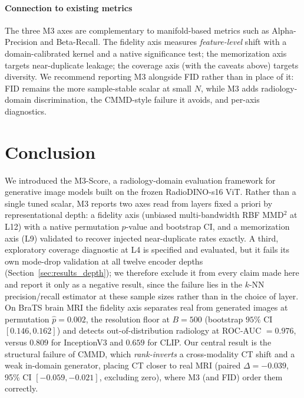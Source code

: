 \documentclass[lettersize,journal]{IEEEtran}
\begin{document}
\paragraph{Connection to existing metrics}
The three M3 axes are complementary to manifold-based metrics such as
Alpha-Precision and Beta-Recall. The fidelity axis measures
\emph{feature-level} shift with a domain-calibrated kernel and a native
significance test; the memorization axis targets near-duplicate leakage; the
coverage axis (with the caveats above) targets diversity. We recommend
reporting M3 alongside FID rather than in place of it: FID remains the more
sample-stable scalar at small $N$, while M3 adds radiology-domain
discrimination, the CMMD-style failure it avoids, and per-axis diagnostics.

\section{Conclusion}
\label{sec:conclusion}

We introduced the M3-Score, a radiology-domain evaluation framework for
generative image models built on the frozen RadioDINO-s16 ViT. Rather than a
single tuned scalar, M3 reports two axes read from layers fixed a priori by
representational depth: a fidelity axis (unbiased multi-bandwidth RBF
MMD$^2$ at L12) with a native permutation $p$-value and bootstrap CI, and a
memorization axis (L9) validated to recover injected near-duplicate rates
exactly. A third, exploratory coverage diagnostic at L4 is specified and
evaluated, but it fails its own mode-drop validation at all twelve encoder
depths (Section~\ref{sec:results_depth}); we therefore exclude it from every
claim made here and report it only as a negative result, since the failure
lies in the $k$-NN precision/recall estimator at these sample sizes rather
than in the choice of layer.
On BraTS brain MRI the fidelity axis separates real from generated images at
permutation $\hat{p} = 0.002$, the resolution floor at $B=500$ (bootstrap $95\%$ CI $[0.146,0.162]$)
and detects out-of-distribution radiology at
ROC-AUC $= 0.976$, versus $0.809$ for InceptionV3 and $0.659$ for CLIP. Our
central result is the structural failure of CMMD, which \emph{rank-inverts} a
cross-modality CT shift and a weak in-domain generator, placing CT closer to
real MRI (paired $\Delta = -0.039$, 95\% CI $[-0.059,-0.021]$, excluding
zero), where M3 (and FID) order them correctly.
\end{document}
